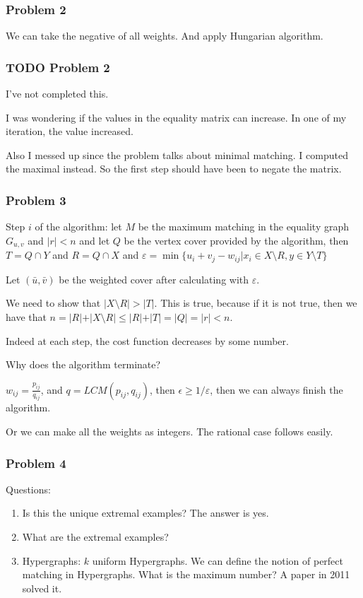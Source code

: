 \documentclass[11pt]{article}
\def\min{\operatorname{min}}
\begin{document}
\subsubsection{Problem 2}
\label{sec:org2836ac9}
We can take the negative of all weights. And apply Hungarian algorithm.
\subsubsection{{\bfseries\sffamily TODO} Problem 2}
\label{sec:orga73b283}
I've not completed this.

I was wondering if the values in the equality matrix can increase. In one of
my iteration, the value increased.

Also I messed up since the problem talks about minimal matching. I computed
the maximal instead. So the first step should have been to negate the
matrix.
\subsubsection{Problem 3}
\label{sec:org54c0abb}
Step \(i\) of the algorithm: let \(M\) be the maximum matching in the equality
graph \(G_{u, v}\) and \(\vert r \vert < n\) and let \(Q\) be the vertex cover
provided by the algorithm, then \(T = Q \cap Y\) and \(R = Q \cap X\) and
\(\varepsilon = \min \{u_i + v_j - w_{ij}\vert x_i \in X \setminus R, y \in Y
    \setminus T\}\)

Let \((\bar u, \bar v)\) be the weighted cover after calculating with
\(\varepsilon\).

We need to show that \(\vert X \setminus R \vert > \vert T \vert\). This is
true, because if it is not true, then we have that \(n = \vert R \vert +
    \vert X \setminus R \vert \le \vert R \vert + \vert T \vert = \vert Q \vert
    = \vert r \vert < n\).

Indeed at each step, the cost function decreases by some number.

Why does the algorithm terminate?

\(w_{ij} = \frac{p_{ij}}{q_{ij}}\), and \(q = LCM(p_{ij}, q_{ij})\), then
\(\epsilon \ge 1/\varepsilon\), then we can always finish the algorithm.

Or we can make all the weights as integers. The rational case follows
easily.
\subsubsection{Problem 4}
\label{sec:org063d1a4}
Questions:
\begin{enumerate}
\item Is this the unique extremal examples? The answer is yes.
\item What are the extremal examples?
\item Hypergraphs: \(k\) uniform Hypergraphs. We can define the notion of perfect
matching in Hypergraphs. What is the maximum number? A paper in 2011
solved it.
\end{enumerate}
\end{document}
